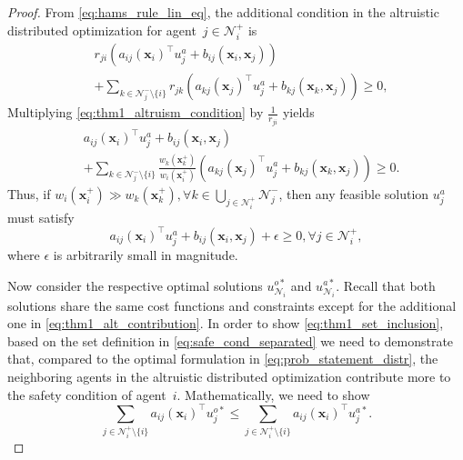 \documentclass[10pt,a4paper]{amsart}
\begin{document}
\begin{proof}
     From \eqref{eq:hams_rule_lin_eq}, the additional condition in the altruistic distributed optimization for agent~$j \in \mathcal{N}_i^+$ is
    \begin{equation}\label{eq:thm1_altruism_condition}
       \begin{aligned}
            &r_{ji} (a_{ij}(\mathbf{x}_i)^\top u_j^a + b_{ij}(\mathbf{x}_i,\mathbf{x}_j)) \\ 
            &+ \sum_{k \in \mathcal{N}_j^- \setminus \{i\}} r_{jk} \left(a_{kj}(\mathbf{x}_j)^\top u_j^a + b_{kj}(\mathbf{x}_k,\mathbf{x}_j)\right) \geq 0, 
       \end{aligned}
    \end{equation}
    Multiplying \eqref{eq:thm1_altruism_condition} by $\frac{1}{r_{ji}}$ yields
    \begin{equation*}
      \begin{aligned}
           & a_{ij}(\mathbf{x}_i)^\top u_j^a + b_{ij}(\mathbf{x}_i,\mathbf{x}_j) \\ 
            & + \sum_{k \in \mathcal{N}_j^-\setminus \{i\}} \frac{w_k(\mathbf{x}_k^+)}{w_i(\mathbf{x}_i^+)} \left(a_{kj}(\mathbf{x}_j)^\top u_j^a + b_{kj}(\mathbf{x}_k,\mathbf{x}_j)\right) \geq 0. 
       \end{aligned}
    \end{equation*}
    Thus, if $w_i(\mathbf{x}_i^+) \gg w_k(\mathbf{x}_k^+), \forall k \in \bigcup_{j \in \mathcal{N}_i^+} \mathcal{N}_j^-$, then any feasible solution $u_j^a$ must satisfy
    \begin{equation} \label{eq:thm1_alt_contribution}
        a_{ij}(\mathbf{x}_i)^\top u_j^a + b_{ij}(\mathbf{x}_i,\mathbf{x}_j) + \epsilon \geq 0, \forall j \in  \mathcal{N}_i^+,
    \end{equation}
    where $\epsilon$ is arbitrarily small in magnitude. 
    
    Now consider the respective optimal solutions $u_{\mathcal{N}_i}^{o*}$ and $u_{\mathcal{N}_i}^{a*}$. Recall that both solutions share the same cost functions and constraints except for the additional one in \eqref{eq:thm1_alt_contribution}.  In order to show \eqref{eq:thm1_set_inclusion}, based on the set definition in \eqref{eq:safe_cond_separated} we need to demonstrate that, compared to the optimal formulation in \eqref{eq:prob_statement_distr}, the neighboring agents in the altruistic distributed optimization contribute more to the safety condition of agent~$i$. Mathematically, we need to show
    \begin{equation} \label{eq:thm1_key_inequality}
        \sum_{j \in \mathcal{N}_i^+ \setminus \{i\}} a_{ij}(\mathbf{x}_i)^\top u_j^{o*}  \leq \sum_{j \in \mathcal{N}_i^+ \setminus \{i\}} a_{ij}(\mathbf{x}_i)^\top u_j^{a*}.
    \end{equation}
    

\end{proof}
\end{document}
